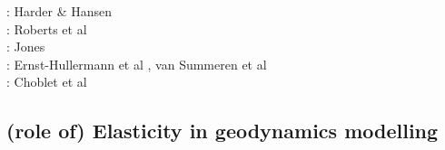 \begin{scriptsize}
\twothousandfive: Harder \& Hansen \cite{haha05}\\
\twothousandnine: Roberts et al \cite{rolm09}\\
\twothousandeleven: Jones \cite{jone11}\\
\twothousandthirteen: Ernst-Hullermann et al \cite{erhh13}, van Summeren et al \cite{vagc13}\\
\twothousandsixteen: Choblet et al \cite{chah16}
\end{scriptsize}

\subsection{(role of) Elasticity in geodynamics modelling}

